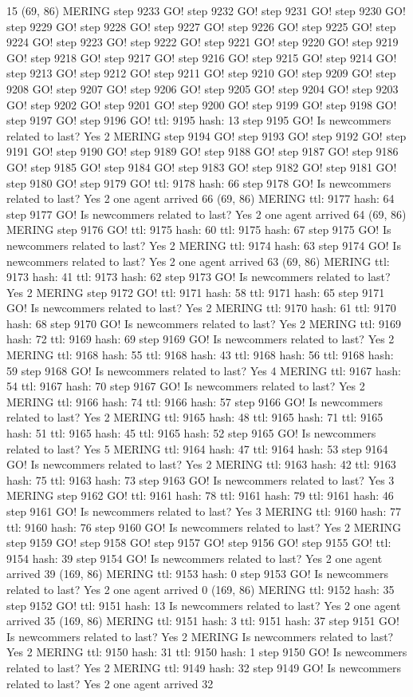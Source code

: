 15 (69, 86) MERING step 9233 GO! step 9232 GO! step 9231 GO! step 9230 GO! step 9229 GO! step 9228 GO! step 9227 GO! step 9226 GO! step 9225 GO! step 9224 GO! step 9223 GO! step 9222 GO! step 9221 GO! step 9220 GO! step 9219 GO! step 9218 GO! step 9217 GO! step 9216 GO! step 9215 GO! step 9214 GO! step 9213 GO! step 9212 GO! step 9211 GO! step 9210 GO! step 9209 GO! step 9208 GO! step 9207 GO! step 9206 GO! step 9205 GO! step 9204 GO! step 9203 GO! step 9202 GO! step 9201 GO! step 9200 GO! step 9199 GO! step 9198 GO! step 9197 GO! step 9196 GO! ttl: 9195 hash: 13 step 9195 GO! Is newcommers related to last? Yes 2 MERING step 9194 GO! step 9193 GO! step 9192 GO! step 9191 GO! step 9190 GO! step 9189 GO! step 9188 GO! step 9187 GO! step 9186 GO! step 9185 GO! step 9184 GO! step 9183 GO! step 9182 GO! step 9181 GO! step 9180 GO! step 9179 GO! ttl: 9178 hash: 66 step 9178 GO! Is newcommers related to last? Yes 2 one agent arrived 66 (69, 86) MERING ttl: 9177 hash: 64 step 9177 GO! Is newcommers related to last? Yes 2 one agent arrived 64 (69, 86) MERING step 9176 GO! ttl: 9175 hash: 60 ttl: 9175 hash: 67 step 9175 GO! Is newcommers related to last? Yes 2 MERING ttl: 9174 hash: 63 step 9174 GO! Is newcommers related to last? Yes 2 one agent arrived 63 (69, 86) MERING ttl: 9173 hash: 41 ttl: 9173 hash: 62 step 9173 GO! Is newcommers related to last? Yes 2 MERING step 9172 GO! ttl: 9171 hash: 58 ttl: 9171 hash: 65 step 9171 GO! Is newcommers related to last? Yes 2 MERING ttl: 9170 hash: 61 ttl: 9170 hash: 68 step 9170 GO! Is newcommers related to last? Yes 2 MERING ttl: 9169 hash: 72 ttl: 9169 hash: 69 step 9169 GO! Is newcommers related to last? Yes 2 MERING ttl: 9168 hash: 55 ttl: 9168 hash: 43 ttl: 9168 hash: 56 ttl: 9168 hash: 59 step 9168 GO! Is newcommers related to last? Yes 4 MERING ttl: 9167 hash: 54 ttl: 9167 hash: 70 step 9167 GO! Is newcommers related to last? Yes 2 MERING ttl: 9166 hash: 74 ttl: 9166 hash: 57 step 9166 GO! Is newcommers related to last? Yes 2 MERING ttl: 9165 hash: 48 ttl: 9165 hash: 71 ttl: 9165 hash: 51 ttl: 9165 hash: 45 ttl: 9165 hash: 52 step 9165 GO! Is newcommers related to last? Yes 5 MERING ttl: 9164 hash: 47 ttl: 9164 hash: 53 step 9164 GO! Is newcommers related to last? Yes 2 MERING ttl: 9163 hash: 42 ttl: 9163 hash: 75 ttl: 9163 hash: 73 step 9163 GO! Is newcommers related to last? Yes 3 MERING step 9162 GO! ttl: 9161 hash: 78 ttl: 9161 hash: 79 ttl: 9161 hash: 46 step 9161 GO! Is newcommers related to last? Yes 3 MERING ttl: 9160 hash: 77 ttl: 9160 hash: 76 step 9160 GO! Is newcommers related to last? Yes 2 MERING step 9159 GO! step 9158 GO! step 9157 GO! step 9156 GO! step 9155 GO! ttl: 9154 hash: 39 step 9154 GO! Is newcommers related to last? Yes 2 one agent arrived 39 (169, 86) MERING ttl: 9153 hash: 0 step 9153 GO! Is newcommers related to last? Yes 2 one agent arrived 0 (169, 86) MERING ttl: 9152 hash: 35 step 9152 GO! ttl: 9151 hash: 13 Is newcommers related to last? Yes 2 one agent arrived 35 (169, 86) MERING ttl: 9151 hash: 3 ttl: 9151 hash: 37 step 9151 GO! Is newcommers related to last? Yes 2 MERING Is newcommers related to last? Yes 2 MERING ttl: 9150 hash: 31 ttl: 9150 hash: 1 step 9150 GO! Is newcommers related to last? Yes 2 MERING ttl: 9149 hash: 32 step 9149 GO! Is newcommers related to last? Yes 2 one agent arrived 32 